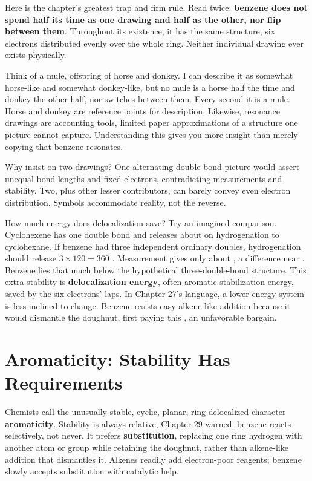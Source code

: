 Here is the chapter's greatest trap and firm rule. Read twice: \textbf{benzene does not spend half its time as one drawing and half as the other, nor flip between them}. Throughout its existence, it has the same structure, six electrons distributed evenly over the whole ring. Neither individual drawing ever exists physically.

Think of a mule, offspring of horse and donkey. I can describe it as somewhat horse-like and somewhat donkey-like, but no mule is a horse half the time and donkey the other half, nor switches between them. Every second it is a mule. Horse and donkey are reference points for description. Likewise, resonance drawings are accounting tools, limited paper approximations of a structure one picture cannot capture. Understanding this gives you more insight than merely copying that benzene resonates.

Why insist on two drawings? One alternating-double-bond picture would assert unequal bond lengths and fixed electrons, contradicting measurements and stability. Two, plus other lesser contributors, can barely convey even electron distribution. Symbols accommodate reality, not the reverse.

\begin{qiaoliang}
How much energy does delocalization save? Try an imagined comparison. Cyclohexene has one double bond and releases about  on hydrogenation to cyclohexane. If benzene had three independent ordinary doubles, hydrogenation should release $3\times 120=360$ . Measurement gives only about , a difference near . Benzene lies that much below the hypothetical three-double-bond structure. This extra stability is \textbf{delocalization energy}, often aromatic stabilization energy, saved by the six electrons' laps. In Chapter 27's language, a lower-energy system is less inclined to change. Benzene resists easy alkene-like addition because it would dismantle the doughnut, first paying this , an unfavorable bargain.
\end{qiaoliang}

\section{Aromaticity: Stability Has Requirements}

Chemists call the unusually stable, cyclic, planar, ring-delocalized character \textbf{aromaticity}. Stability is always relative, Chapter 29 warned: benzene reacts selectively, not never. It prefers \textbf{substitution}, replacing one ring hydrogen with another atom or group while retaining the doughnut, rather than alkene-like addition that dismantles it. Alkenes readily add electron-poor reagents; benzene slowly accepts substitution with catalytic help.

